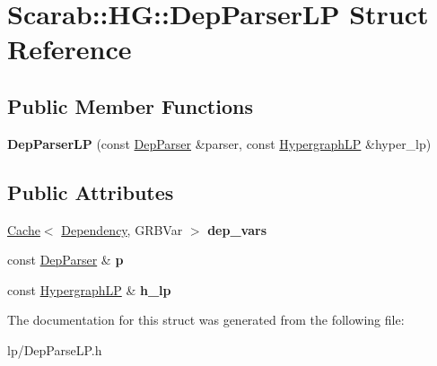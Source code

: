 \hypertarget{structScarab_1_1HG_1_1DepParserLP}{
\section{Scarab::HG::DepParserLP Struct Reference}
\label{structScarab_1_1HG_1_1DepParserLP}
}
\subsection*{Public Member Functions}
\begin{DoxyCompactItemize}
\item 
\hypertarget{structScarab_1_1HG_1_1DepParserLP_aaec1248e50de35594c4a20e89a782e95}{
{\bfseries DepParserLP} (const \hyperlink{classDepParser}{DepParser} \&parser, const \hyperlink{structScarab_1_1HG_1_1HypergraphLP}{HypergraphLP} \&hyper\_\-lp)}
\label{structScarab_1_1HG_1_1DepParserLP_aaec1248e50de35594c4a20e89a782e95}

\end{DoxyCompactItemize}
\subsection*{Public Attributes}
\begin{DoxyCompactItemize}
\item 
\hypertarget{structScarab_1_1HG_1_1DepParserLP_af31e9d91e3407559cd2588bfef2296e3}{
\hyperlink{classCache}{Cache}$<$ \hyperlink{structDependency}{Dependency}, GRBVar $>$ {\bfseries dep\_\-vars}}
\label{structScarab_1_1HG_1_1DepParserLP_af31e9d91e3407559cd2588bfef2296e3}

\item 
\hypertarget{structScarab_1_1HG_1_1DepParserLP_a93d0f269dabdd6fe83c68ee51baafb62}{
const \hyperlink{classDepParser}{DepParser} \& {\bfseries p}}
\label{structScarab_1_1HG_1_1DepParserLP_a93d0f269dabdd6fe83c68ee51baafb62}

\item 
\hypertarget{structScarab_1_1HG_1_1DepParserLP_acab7463a0d1349c5a1250ac0653c0569}{
const \hyperlink{structScarab_1_1HG_1_1HypergraphLP}{HypergraphLP} \& {\bfseries h\_\-lp}}
\label{structScarab_1_1HG_1_1DepParserLP_acab7463a0d1349c5a1250ac0653c0569}

\end{DoxyCompactItemize}


The documentation for this struct was generated from the following file:\begin{DoxyCompactItemize}
\item 
lp/DepParseLP.h\end{DoxyCompactItemize}
